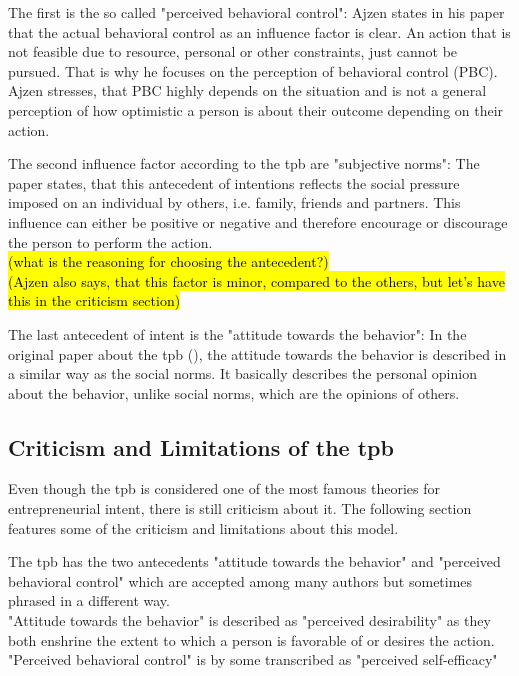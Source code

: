 The first is the so called "perceived behavioral control": Ajzen states in his paper that the actual behavioral control as an influence factor is clear. An action that is not feasible due to resource, personal or other constraints, just cannot be pursued. That is why he focuses on the perception of behavioral control (PBC). Ajzen stresses, that PBC highly depends on the situation and is not a general perception of how optimistic a person is about their outcome depending on their action.

The second influence factor according to the \ac{tpb} are "subjective norms": The paper \cite{ajzen1991theory} states, that this antecedent of intentions reflects the social pressure imposed on an individual by others, i.e. family, friends and partners. This influence can either be positive or negative and therefore encourage or discourage the person to perform the action.\\
\hl{(what is the reasoning for choosing the antecedent?)}\\
\hl{(Ajzen also says, that this factor is minor, compared to the others, but let's have this in the criticism section)}

The last antecedent of intent is the "attitude towards the behavior": In the original paper about the \ac{tpb} (\cite{ajzen1991theory}), the attitude towards the behavior is described in a similar way as the social norms. It basically describes the personal opinion about the behavior, unlike social norms, which are the opinions of others.


\subsection{Criticism and Limitations of the \acl{tpb}}
Even though the \acl{tpb} is considered one of the most famous theories for entrepreneurial intent, there is still criticism about it. The following section features some of the criticism and limitations about this model.

The \ac{tpb} has the two antecedents "attitude towards the behavior" and "perceived behavioral control" which are accepted among many authors  but sometimes phrased in a different way.\\
"Attitude towards the behavior" is described as "perceived desirability" as they both enshrine the extent to which a person is favorable of or desires the action.
"Perceived behavioral control" is by some transcribed as "perceived self-efficacy"\\

